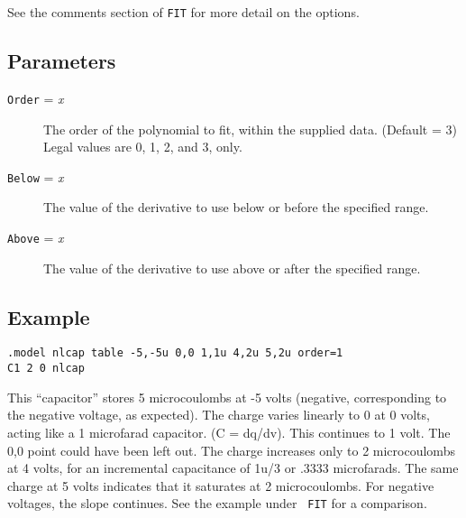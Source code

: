 See the comments section of {\tt FIT} for more detail on the options.
\subsection{Parameters}

\begin{description}
  
\item[{\tt Order} = {\it x}] The order of the polynomial to fit,
  within the supplied data.  (Default = 3) Legal values are 0, 1, 2,
  and 3, only.

\item[{\tt Below} = {\it x}] The value of the derivative to use
below or before the specified range.  

\item[{\tt Above} = {\it x}] The value of the derivative to use
above or after the specified range.

\end{description}
\subsection{Example} 

\begin{verbatim}
.model nlcap table -5,-5u 0,0 1,1u 4,2u 5,2u order=1
C1 2 0 nlcap
\end{verbatim}

This ``capacitor'' stores 5 microcoulombs at -5 volts (negative,
corresponding to the negative voltage, as expected).  The charge
varies linearly to 0 at 0 volts, acting like a 1 microfarad capacitor.
(C = dq/dv).  This continues to 1 volt.  The 0,0 point could have been
left out.  The charge increases only to 2 microcoulombs at 4 volts,
for an incremental capacitance of 1u/3 or .3333 microfarads.  The same
charge at 5 volts indicates that it saturates at 2 microcoulombs.  For
negative voltages, the slope continues.  See the example under {\tt
  FIT} for a comparison.
